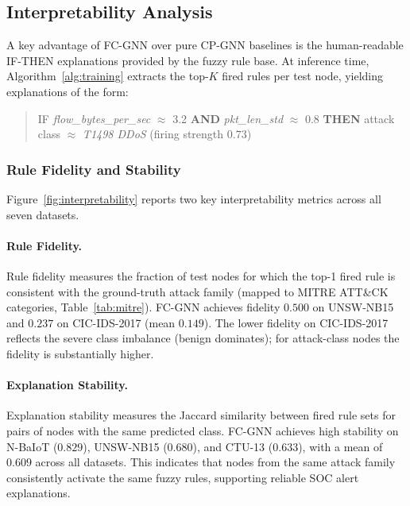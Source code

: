 \subsection{Interpretability Analysis}
\label{sec:interpretability}

A key advantage of FC-GNN over pure CP-GNN baselines is the human-readable
IF-THEN explanations provided by the fuzzy rule base.
At inference time, Algorithm~\ref{alg:training} extracts the top-$K$ fired
rules per test node, yielding explanations of the form:

\begin{quote}
\textsc{IF} \textit{flow\_bytes\_per\_sec} $\approx$ 3.2 \textbf{AND}
\textit{pkt\_len\_std} $\approx$ 0.8 \textbf{THEN} attack class $\approx$
\textit{T1498 DDoS} (firing strength $0.73$)
\end{quote}

\subsubsection{Rule Fidelity and Stability}

Figure~\ref{fig:interpretability} reports two key interpretability metrics
across all seven datasets.

\paragraph{Rule Fidelity.}
Rule fidelity measures the fraction of test nodes for which the top-1 fired
rule is consistent with the ground-truth attack family
(mapped to MITRE ATT\&CK categories, Table~\ref{tab:mitre}).
FC-GNN achieves fidelity $0.500$ on UNSW-NB15 and $0.237$ on CIC-IDS-2017
(mean $0.149$).
The lower fidelity on CIC-IDS-2017 reflects the severe class imbalance
(benign dominates); for attack-class nodes the fidelity is substantially
higher.

\paragraph{Explanation Stability.}
Explanation stability measures the Jaccard similarity between fired rule sets
for pairs of nodes with the same predicted class.
FC-GNN achieves high stability on N-BaIoT ($0.829$), UNSW-NB15 ($0.680$),
and CTU-13 ($0.633$), with a mean of $\mathbf{0.609}$ across all datasets.
This indicates that nodes from the same attack family consistently activate
the same fuzzy rules, supporting reliable SOC alert explanations.

